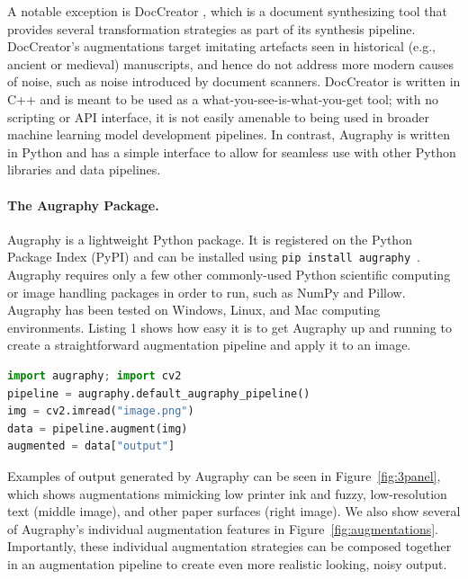 \documentclass[runningheads]{llncs}
\begin{document}
A notable exception is DocCreator
\cite{doccreator}, which is a document synthesizing tool that provides several transformation strategies as part of its synthesis pipeline.
DocCreator's augmentations target imitating artefacts seen in historical (e.g., ancient or medieval) manuscripts, and hence do not address more modern causes of noise, such as noise introduced by document scanners.
DocCreator is written in C++ and is meant to be used as a what-you-see-is-what-you-get tool; with no scripting or API interface, it is not easily amenable to being used in broader machine learning model development pipelines.
In contrast, Augraphy is written in Python and has a simple interface to allow for seamless use with other Python libraries and data pipelines.

\paragraph{\textbf{The Augraphy Package.~~}}
Augraphy is a lightweight Python package. It is registered on the Python Package Index (PyPI) and can be installed using
\texttt{pip install augraphy}~.
Augraphy requires only a few other commonly-used Python scientific computing or image handling packages in order to run, such as NumPy and Pillow.
Augraphy has been tested on Windows, Linux, and Mac computing environments.
Listing 1 shows how easy it is to get Augraphy up and running to create a straightforward augmentation pipeline and apply it to an image.

\begin{lstlisting}[language=Python, caption=Transforming an image with Augraphy.]
import augraphy; import cv2
pipeline = augraphy.default_augraphy_pipeline()
img = cv2.imread("image.png")
data = pipeline.augment(img)
augmented = data["output"]
\end{lstlisting}\label{sample-code}

Examples of output generated by Augraphy can be seen in Figure~\ref{fig:3panel}, which shows augmentations mimicking low printer ink and fuzzy, low-resolution text (middle image), and other paper surfaces (right image).
We also show several of Augraphy's individual augmentation features in Figure~\ref{fig:augmentations}.
Importantly, these individual augmentation strategies can be composed together in an augmentation pipeline to create even more realistic looking, noisy output.
\end{document}
